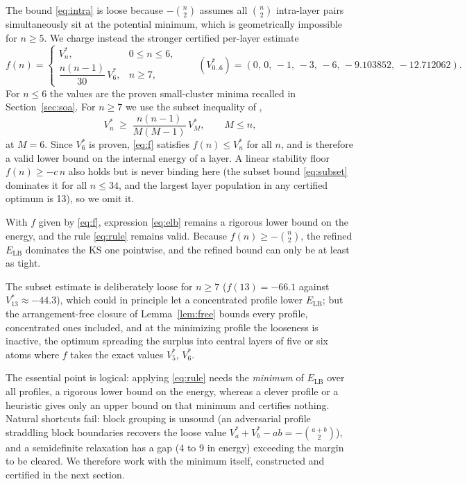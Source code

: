 \documentclass[11pt]{article}
\theoremstyle{remark}
\newcommand{\LB}{\mathrm{LB}}
\begin{document}
The bound \eqref{eq:intra} is loose because $-\binom n2$ assumes all $\binom n2$ intra-layer pairs simultaneously sit at the potential minimum, which is geometrically impossible for $n\ge5$. We charge instead the stronger certified per-layer estimate
\begin{equation}\label{eq:f}
f(n) =
\begin{cases}
V^*_n, & 0\le n\le 6,\\[4pt]
\dfrac{n(n-1)}{30}\, V^*_6, & n\ge 7,
\end{cases}
\qquad
(V^*_{0..6}) = (0,\,0,\,-1,\,-3,\,-6,\,-9.103852,\,-12.712062).
\end{equation}
For $n\le 6$ the values are the proven small-cluster minima recalled in Section~\ref{sec:soa}. For $n\ge7$ we use the subset inequality of \cite{ks2025},
\begin{equation}\label{eq:subset}
V^*_n \;\ge\; \frac{n(n-1)}{M(M-1)}\, V^*_M, \qquad M\le n,
\end{equation}
at $M=6$. Since $V^*_6$ is proven, \eqref{eq:f} satisfies $f(n)\le V^*_n$ for all $n$, and is therefore a valid lower bound on the internal energy of a layer. A linear stability floor $f(n)\ge -c\,n$ also holds but is never binding here (the subset bound \eqref{eq:subset} dominates it for all $n\le34$, and the largest layer population in any certified optimum is 13), so we omit it.

With $f$ given by \eqref{eq:f}, expression \eqref{eq:elb} remains a rigorous lower bound on the energy, and the rule \eqref{eq:rule} remains valid. Because $f(n)\ge-\binom n2$, the refined $E_\LB$ dominates the KS one pointwise, and the refined bound can only be at least as tight.

The subset estimate is deliberately loose for $n\ge7$ ($f(13)=-66.1$ against $V^*_{13}\approx-44.3$), which could in principle let a concentrated profile lower $E_\LB$; but the arrangement-free closure of Lemma~\ref{lem:free} bounds every profile, concentrated ones included, and at the minimizing profile the looseness is inactive, the optimum spreading the surplus into central layers of five or six atoms where $f$ takes the exact values $V^*_5$, $V^*_6$.

The essential point is logical: applying \eqref{eq:rule} needs the \emph{minimum} of $E_\LB$ over all profiles, a rigorous lower bound on the energy, whereas a clever profile or a heuristic gives only an upper bound on that minimum and certifies nothing. Natural shortcuts fail: block grouping is unsound (an adversarial profile straddling block boundaries recovers the loose value $V^*_a+V^*_b-ab=-\binom{a+b}2$), and a semidefinite relaxation has a gap (4 to 9 in energy) exceeding the margin to be cleared. We therefore work with the minimum itself, constructed and certified in the next section.
\end{document}
